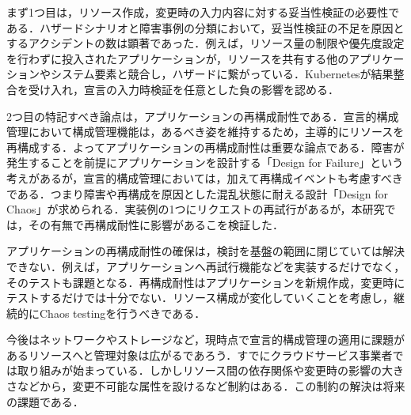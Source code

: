 \documentclass[12pt,a4paper]{article}
\begin{document}
まず1つ目は，リソース作成，変更時の入力内容に対する妥当性検証の必要性である．ハザードシナリオと障害事例の分類において，妥当性検証の不足を原因とするアクシデントの数は顕著であった．例えば，リソース量の制限や優先度設定を行わずに投入されたアプリケーションが，リソースを共有する他のアプリケーションやシステム要素と競合し，ハザードに繋がっている．Kubernetesが結果整合を受け入れ，宣言の入力時検証を任意とした負の影響を認める．

2つ目の特記すべき論点は，アプリケーションの再構成耐性である．宣言的構成管理において構成管理機能は，あるべき姿を維持するため，主導的にリソースを再構成する．よってアプリケーションの再構成耐性は重要な論点である．障害が発生することを前提にアプリケーションを設計する「Design for Failure」という考えがあるが，宣言的構成管理においては，加えて再構成イベントも考慮すべきである．つまり障害や再構成を原因とした混乱状態に耐える設計「Design for Chaos」が求められる．実装例の1つにリクエストの再試行があるが，本研究では，その有無で再構成耐性に影響があるこを検証した．

アプリケーションの再構成耐性の確保は，検討を基盤の範囲に閉じていては解決できない．例えば，アプリケーションへ再試行機能などを実装するだけでなく，そのテストも課題となる．再構成耐性はアプリケーションを新規作成，変更時にテストするだけでは十分でない．リソース構成が変化していくことを考慮し，継続的にChaos testingを行うべきである．

今後はネットワークやストレージなど，現時点で宣言的構成管理の適用に課題があるリソースへと管理対象は広がるであろう．すでにクラウドサービス事業者では取り組みが始まっている．しかしリソース間の依存関係や変更時の影響の大きさなどから，変更不可能な属性を設けるなど制約はある．この制約の解決は将来の課題である．
\end{document}
